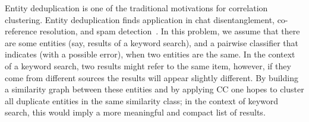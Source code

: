 \documentclass{article} %
\begin{document}
Entity deduplication is one of the traditional motivations for correlation clustering. 
Entity deduplication finds application in chat disentanglement, co-reference resolution, and spam detection~\cite{
elmagarmid2007duplicate,
arasu2009large,
elsner2009bounding,
hussain2013evaluation,
bonchi2014correlation,chierichetti2014correlation}.
In this problem, we assume that there are some entities (say, results of a keyword search), and a pairwise classifier that indicates (with a possible error), when two entities are the same.
In the context of a keyword search, two results might refer to the same item, however, if they come from different sources the results will appear slightly different.
By building a similarity graph between these entities and by applying CC one hopes to cluster all duplicate entities in the same similarity class; in the context of keyword search, this would imply a more meaningful and compact list of results.



\end{document}
